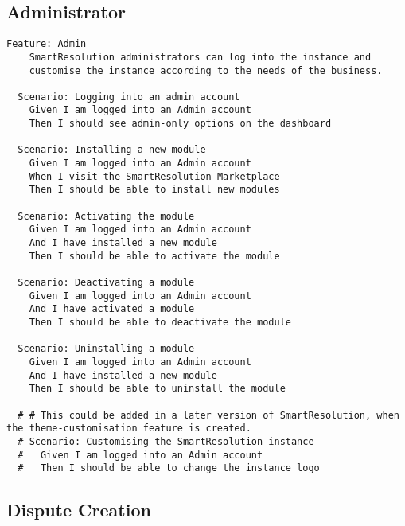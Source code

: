 \subsection{Administrator}

\begin{lstlisting}
Feature: Admin
    SmartResolution administrators can log into the instance and
    customise the instance according to the needs of the business.

  Scenario: Logging into an admin account
    Given I am logged into an Admin account
    Then I should see admin-only options on the dashboard

  Scenario: Installing a new module
    Given I am logged into an Admin account
    When I visit the SmartResolution Marketplace
    Then I should be able to install new modules

  Scenario: Activating the module
    Given I am logged into an Admin account
    And I have installed a new module
    Then I should be able to activate the module

  Scenario: Deactivating a module
    Given I am logged into an Admin account
    And I have activated a module
    Then I should be able to deactivate the module

  Scenario: Uninstalling a module
    Given I am logged into an Admin account
    And I have installed a new module
    Then I should be able to uninstall the module

  # # This could be added in a later version of SmartResolution, when the theme-customisation feature is created.
  # Scenario: Customising the SmartResolution instance
  #   Given I am logged into an Admin account
  #   Then I should be able to change the instance logo
\end{lstlisting}

\subsection{Dispute Creation}

